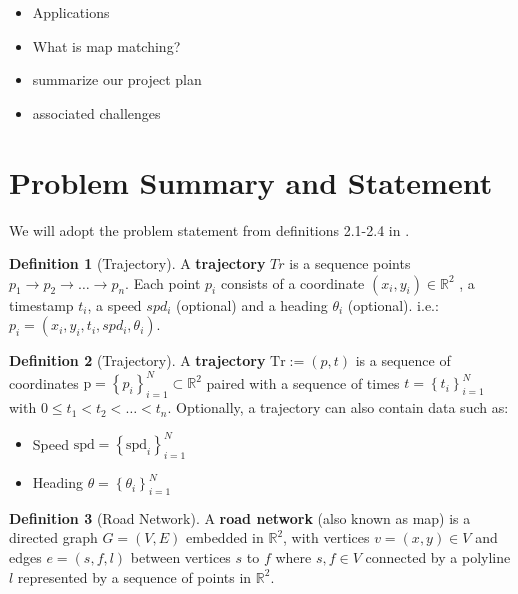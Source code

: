 \documentclass{article}
\numberwithin{equation}{section}
\theoremstyle{definition}
\newtheorem{definition}{Definition}[section]
\newtheorem{remark}[remark]{Remark}
\newcommand{\R}{\mathbb{R}}
\begin{document}
\begin{itemize}
    \item Applications
    \item What is map matching?
    \item summarize our project plan
\item associated challenges 
\end{itemize}


\section{Problem Summary and Statement}


We will adopt the problem statement from definitions 2.1-2.4 in \cite{C}. 

\begin{definition}[Trajectory]
A \textbf{trajectory} $Tr$ is a sequence points $p_1\rightarrow p_2 \rightarrow \dots \rightarrow p_n$. Each point $p_i$ consists of a coordinate $( x_i,y_i)\in \mathbb{R}^2$ , a timestamp $t_i$, a speed $spd_i$ (optional) and a heading $\theta_i$ (optional). i.e.:  $p_i=( x_i,y_i,t_i,spd_i,\theta_i )$.
\end{definition}

\begin{definition}[Trajectory]
	A \textbf{trajectory} \(\textrm{Tr} := (p,t)\) is a sequence of coordinates \(\textrm{p} = \left\{ p_i \right\}_{i=1}^{N} \subset \R^2\) paired with a sequence of times \(t = \left\{t_i \right\}_{i=1}^{N}\) with \(0 \leq t_1 < t_2 < \ldots < t_n\). Optionally, a trajectory can also contain data such as:
	\begin{itemize}
		\item Speed \(\textrm{spd} = \left\{\textrm{spd}_i \right\}_{i=1}^{N}\) 
		\item Heading \(\theta = \left\{\theta_i \right\}_{i=1}^{N}\) 
	\end{itemize}
\end{definition}

\begin{definition}[Road Network]
A  \textbf{road network} (also known as map) is a directed graph $G=(V,E)$ embedded in $\mathbb{R}^2$, with vertices $v=(x,y)\in V$ and edges $e = (s, f, l)$  between vertices $s$ to $f$  where $s,f\in V$ connected by a polyline $l$ represented by a sequence of points in $\mathbb{R}^2$. %


\end{definition}
\end{document}
